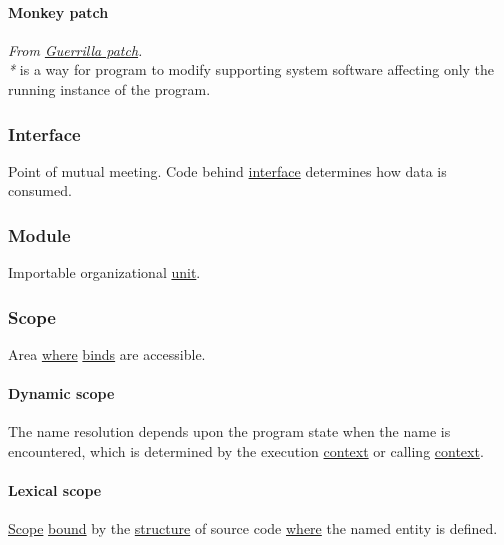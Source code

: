 \documentclass[11pt]{article}
\begin{document}
\paragraph{\label{org68cde61}Monkey patch}
\label{sec:orga3ba4f0}
\emph{From \hyperref[org9398c24]{Guerrilla patch}.}\\

\emph{*} is a way for program to modify supporting system software affecting only the running instance of the program.\\

\subsubsection{\label{orgf9bdf66}Interface}
\label{sec:org130075d}
Point of mutual meeting. Code behind \hyperref[orgf9bdf66]{interface} determines how data is consumed.\\

\subsubsection{\label{org5699463}Module}
\label{sec:org67d478d}
Importable organizational \hyperref[org0b3ee46]{unit}.\\

\subsubsection{\label{orgb3c0d1a}Scope}
\label{sec:org8a8c3ec}
Area \hyperref[org3e5903d]{where} \hyperref[orgdb14c59]{binds} are accessible.\\

\paragraph{\label{orge1b039a}Dynamic scope}
\label{sec:orgf753815}
The name resolution depends upon the program state when the name is encountered, which is determined by the execution \hyperref[org2ec7d4f]{context} or calling \hyperref[org2ec7d4f]{context}.\\

\paragraph{\label{org6a58f4c}Lexical scope}
\label{sec:orgd4780ae}
\hyperref[orgb3c0d1a]{Scope} \hyperref[orgaac83d9]{bound} by the \hyperref[org8051f61]{structure} of source code \hyperref[org3e5903d]{where} the named entity is defined.\\
\end{document}
